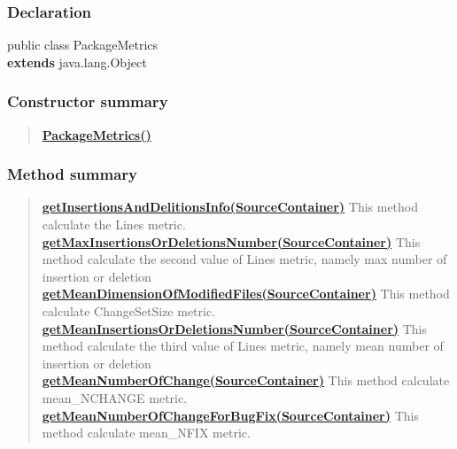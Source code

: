 {{{{{{\subsubsection{Declaration}{
\small public class PackageMetrics
\\ {\bf  extends} java.lang.Object
}
\subsubsection{Constructor summary}{
\begin{verse}
\hyperlink{it.unisa.sesa.repominer.metrics.PackageMetrics()}{{\bf PackageMetrics()}} \\
\end{verse}
}
\subsubsection{Method summary}{
\begin{verse}
\hyperlink{it.unisa.sesa.repominer.metrics.PackageMetrics.getInsertionsAndDelitionsInfo(it.unisa.sesa.repominer.db.entities.SourceContainer)}{{\bf getInsertionsAndDelitionsInfo(SourceContainer)}} This method calculate the Lines metric.\\
\hyperlink{it.unisa.sesa.repominer.metrics.PackageMetrics.getMaxInsertionsOrDeletionsNumber(it.unisa.sesa.repominer.db.entities.SourceContainer)}{{\bf getMaxInsertionsOrDeletionsNumber(SourceContainer)}} This method calculate the second value of Lines metric, namely max number of insertion or deletion\\
\hyperlink{it.unisa.sesa.repominer.metrics.PackageMetrics.getMeanDimensionOfModifiedFiles(it.unisa.sesa.repominer.db.entities.SourceContainer)}{{\bf getMeanDimensionOfModifiedFiles(SourceContainer)}} This method calculate ChangeSetSize metric.\\
\hyperlink{it.unisa.sesa.repominer.metrics.PackageMetrics.getMeanInsertionsOrDeletionsNumber(it.unisa.sesa.repominer.db.entities.SourceContainer)}{{\bf getMeanInsertionsOrDeletionsNumber(SourceContainer)}} This method calculate the third value of Lines metric, namely mean number of insertion or deletion\\
\hyperlink{it.unisa.sesa.repominer.metrics.PackageMetrics.getMeanNumberOfChange(it.unisa.sesa.repominer.db.entities.SourceContainer)}{{\bf getMeanNumberOfChange(SourceContainer)}} This method calculate mean\_NCHANGE metric.\\
\hyperlink{it.unisa.sesa.repominer.metrics.PackageMetrics.getMeanNumberOfChangeForBugFix(it.unisa.sesa.repominer.db.entities.SourceContainer)}{{\bf getMeanNumberOfChangeForBugFix(SourceContainer)}} This method calculate mean\_NFIX metric.\\

\end{verse}}}}}}}}
